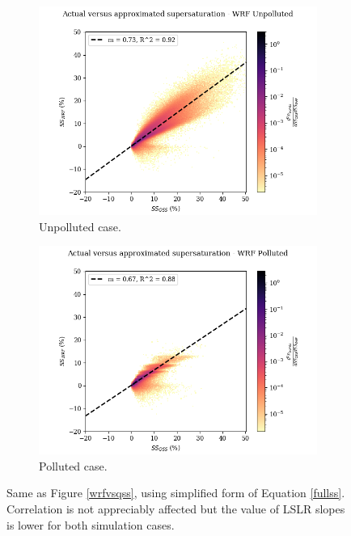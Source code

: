 \documentclass{article}
\begin{document}
\begin{figure}[ht]
	\centering
	\begin{subfigure}{0.7\textwidth}
		\includegraphics[width=\textwidth]{wrf/simpleqss_heatmap_ss_qss_vs_ss_wrf_Unpolluted_figure.png}
		\caption{Unpolluted case.}
		\label{simpleqsswrfvsqssunpoll}
	\end{subfigure}
	\begin{subfigure}{0.7\textwidth}
		\includegraphics[width=\textwidth]{wrf/simpleqss_heatmap_ss_qss_vs_ss_wrf_Polluted_figure.png}
		\caption{Polluted case.}
		\label{simpleqsswrfvsqsspoll}
	\end{subfigure}
	\caption{Same as Figure \ref{wrfvsqss}, using simplified form of Equation \ref{fullss}. Correlation is not appreciably affected but the value of LSLR slopes is lower for both simulation cases.}
	\label{simpleqsswrfvsqss}
\end{figure}
\end{document}
